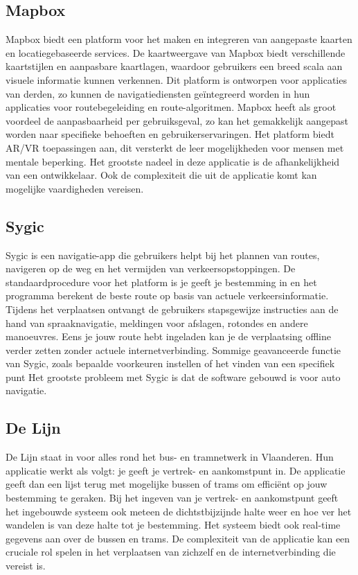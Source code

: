 \subsection{Mapbox}
\label{sec:mapbox}

Mapbox biedt een platform voor het maken en integreren van aangepaste kaarten en locatiegebaseerde services. De kaartweergave van Mapbox biedt verschillende kaartstijlen en aanpasbare kaartlagen, waardoor gebruikers een breed scala aan visuele informatie kunnen verkennen. Dit platform is ontworpen voor applicaties van derden, zo kunnen de navigatiediensten geïntegreerd worden in hun applicaties voor routebegeleiding en route-algoritmen. Mapbox heeft als groot voordeel de aanpasbaarheid per gebruiksgeval, zo kan het gemakkelijk aangepast worden naar specifieke behoeften en gebruikerservaringen. Het platform biedt AR/VR toepassingen aan, dit versterkt de leer mogelijkheden voor mensen met mentale beperking. Het grootste nadeel in deze applicatie is de afhankelijkheid van een ontwikkelaar. Ook de complexiteit die uit de applicatie komt kan mogelijke vaardigheden vereisen.

\subsection{Sygic}
\label{sec:sygic}

Sygic is een navigatie-app die gebruikers helpt bij het plannen van routes, navigeren op de weg en het vermijden van verkeersopstoppingen. De standaardprocedure voor het platform is je geeft je bestemming in en het programma berekent de beste route op basis van actuele verkeersinformatie. Tijdens het verplaatsen ontvangt de gebruikers stapsgewijze instructies aan de hand van spraaknavigatie, meldingen voor afslagen, rotondes en andere manoeuvres. Eens je jouw route hebt ingeladen kan je de verplaatsing offline verder zetten zonder actuele internetverbinding. Sommige geavanceerde functie van Sygic, zoals bepaalde voorkeuren instellen of het vinden van een specifiek punt %
Het grootste probleem met Sygic is dat de software gebouwd is voor auto navigatie.

\subsection{De Lijn}
\label{sec:de-lijn}

De Lijn staat in voor alles rond het bus- en tramnetwerk in Vlaanderen. Hun applicatie werkt als volgt: je geeft je vertrek- en aankomstpunt in. De applicatie geeft dan een lijst terug met mogelijke bussen of trams om efficiënt op jouw bestemming te geraken. Bij het ingeven van je vertrek- en aankomstpunt geeft het ingebouwde systeem ook meteen de dichtstbijzijnde halte weer en hoe ver het wandelen is van deze halte tot je bestemming. Het systeem biedt ook real-time gegevens aan over de bussen en trams. De complexiteit van de applicatie kan een cruciale rol spelen in het verplaatsen van zichzelf en de internetverbinding die vereist is.

